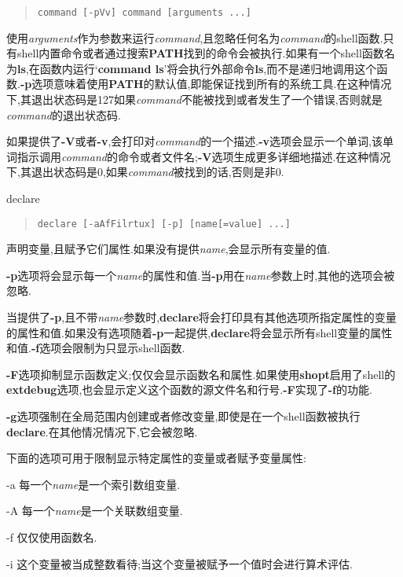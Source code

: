 \documentclass[draft,openany]{book}
\begin{document}
\begin{CJK}{UTF8}{gbsn}
\begin{basedescript}{\desclabelstyle{\nextlinelabel}\desclabelwidth{2.5em}}
\begin{quote}
            \verb+command [-pVv] command [arguments ...]+
        \end{quote}
        使用\emph{arguments}作为参数来运行\emph{command},且忽略任何名为\emph{command}的shell函数.只有shell内置命令或者通过搜索\textbf{PATH}找到的命令会被执行.如果有一个shell函数名为\textbf{ls},在函数内运行`\textbf{command ls}'将会执行外部命令\textbf{ls},而不是递归地调用这个函数.\textbf{-p}选项意味着使用\textbf{PATH}的默认值,即能保证找到所有的系统工具.在这种情况下,其退出状态码是127如果\emph{command}不能被找到或者发生了一个错误,否则就是\emph{command}的退出状态码.\par
        如果提供了\textbf{-V}或者\textbf{-v},会打印对\emph{command}的一个描述.\textbf{-v}选项会显示一个单词,该单词指示调用\emph{command}的命令或者文件名;\textbf{-V}选项生成更多详细地描述.在这种情况下,其退出状态码是0,如果\emph{command}被找到的话,否则是非0.
    \item[declare]
        \begin{quote}
            \verb+declare [-aAfFilrtux] [-p] [name[=value] ...]+
        \end{quote}
        声明变量,且赋予它们属性.如果没有提供\emph{name},会显示所有变量的值.\par
        \textbf{-p}选项将会显示每一个\emph{name}的属性和值.当\textbf{-p}用在\emph{name}参数上时,其他的选项会被忽略.\par
        当提供了\textbf{-p},且不带\emph{name}参数时,\textbf{declare}将会打印具有其他选项所指定属性的变量的属性和值.如果没有选项随着\textbf{-p}一起提供,\textbf{declare}将会显示所有shell变量的属性和值.\textbf{-f}选项会限制为只显示shell函数.\par
        \textbf{-F}选项抑制显示函数定义;仅仅会显示函数名和属性.如果使用\textbf{shopt}启用了shell的\textbf{extdebug}选项,也会显示定义这个函数的源文件名和行号.\textbf{-F}实现了\textbf{-f}的功能.\par
        \textbf{-g}选项强制在全局范围内创建或者修改变量,即使是在一个shell函数被执行\textbf{declare}.在其他情况情况下,它会被忽略.\par
        下面的选项可用于限制显示特定属性的变量或者赋予变量属性:
        \begin{basedescript}{\desclabelstyle{\nextlinelabel}\desclabelwidth{2.5em}}
        \item[-a] 每一个\emph{name}是一个索引数组变量.
        \item[-A] 每一个\emph{name}是一个关联数组变量.
        \item[-f] 仅仅使用函数名.
        \item[-i] 这个变量被当成整数看待;当这个变量被赋予一个值时会进行算术评估.

\end{basedescript}
\end{basedescript}
\end{CJK}
\end{document}
